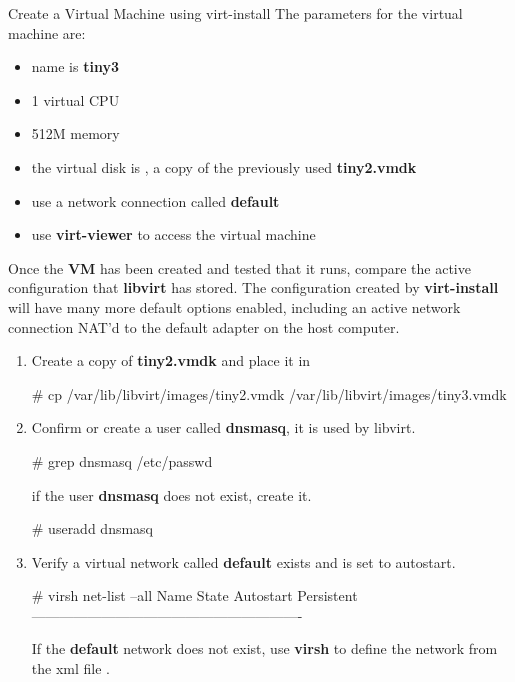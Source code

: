 \begin{Lab}
\begin{exe}  {Create a Virtual Machine using virt-install}
	 The parameters for the virtual machine are:
        \begin{itemize}
                \item name is \textbf{tiny3}
                \item 1 virtual CPU
                \item 512M memory
                \item the virtual disk is ,
			a copy of the previously used \textbf{tiny2.vmdk}
		\item use a network connection called \textbf{default}
                \item use \textbf{virt-viewer} to access the virtual machine
	\end{itemize} 

	Once the \textbf{VM} has been created and tested that it runs, compare the active 
	configuration that \textbf{libvirt} has stored. The configuration created by
	\textbf{virt-install} will have many more default options enabled, including 
	an active network connection NAT'd to the default adapter on the host computer.

	\begin{sol}
		\begin{enumerate}
		\item  Create a copy of \textbf{tiny2.vmdk} and place it in
			\begin{raw}
# cp /var/lib/libvirt/images/tiny2.vmdk /var/lib/libvirt/images/tiny3.vmdk
			\end{raw}
		\item Confirm or create a user called \textbf{dnsmasq}, it is used by
			libvirt. 
		\begin{raw}
# grep dnsmasq /etc/passwd
		\end{raw} 
			if the user \textbf{dnsmasq}  does not exist, create it.
		\begin{raw}
# useradd dnsmasq
		\end{raw} 
		\item Verify a virtual network called \textbf{default} 
			exists and is set to autostart.
				\begin{raw}
# virsh net-list --all 
 Name                 State      Autostart     Persistent
----------------------------------------------------------

				\end{raw} 
			If the \textbf{default} network does not exist, use
				\textbf{virsh} to define the network from the xml
				file . 
				

\end{enumerate}
\end{sol}
\end{exe}
\end{Lab}
